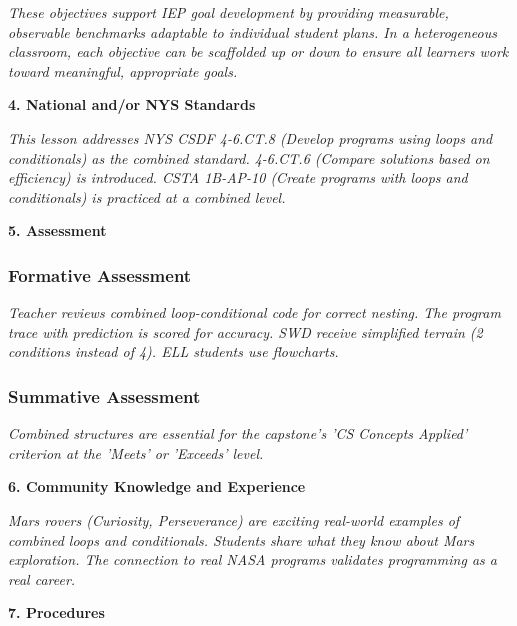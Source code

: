 \documentclass[11pt,letterpaper]{article}
\begin{document}
\textit{These objectives support IEP goal development by providing measurable, observable benchmarks adaptable to individual student plans. In a heterogeneous classroom, each objective can be scaffolded up or down to ensure all learners work toward meaningful, appropriate goals.}

\textbf{4. National and/or NYS Standards}

\textit{This lesson addresses NYS CSDF 4-6.CT.8 (Develop programs using loops and conditionals) as the combined standard. 4-6.CT.6 (Compare solutions based on efficiency) is introduced. CSTA 1B-AP-10 (Create programs with loops and conditionals) is practiced at a combined level.}

\newpage
\textbf{5. Assessment}

\subsubsection{Formative Assessment}

\textit{Teacher reviews combined loop-conditional code for correct nesting. The program trace with prediction is scored for accuracy. SWD receive simplified terrain (2 conditions instead of 4). ELL students use flowcharts.}

\subsubsection{Summative Assessment}

\textit{Combined structures are essential for the capstone's 'CS Concepts Applied' criterion at the 'Meets' or 'Exceeds' level.}

\textbf{6. Community Knowledge and Experience}

\textit{Mars rovers (Curiosity, Perseverance) are exciting real-world examples of combined loops and conditionals. Students share what they know about Mars exploration. The connection to real NASA programs validates programming as a real career.}

\textbf{7. Procedures}
\end{document}
